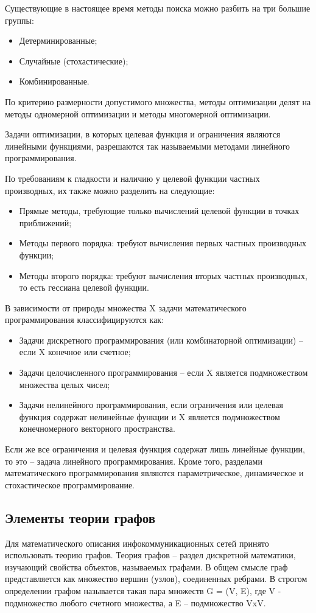 \documentclass[14pt,a4paper,titlepage]{extarticle}
\begin{document}
Существующие в настоящее время методы поиска можно разбить на три большие группы: 
\begin{itemize}
\item Детерминированные; 
\item Случайные (стохастические);
\item Комбинированные.
\end{itemize}

По критерию размерности допустимого множества, методы оптимизации делят на методы одномерной оптимизации и методы многомерной оптимизации. 

Задачи оптимизации, в которых целевая функция и ограничения являются линейными функциями, разрешаются так называемыми методами линейного программирования.

По требованиям к гладкости и наличию у целевой функции частных производных, их также можно разделить на следующие: 
\begin{itemize}
\item Прямые методы, требующие только вычислений целевой функции в точках приближений; 
\item Методы первого порядка: требуют вычисления первых частных производных функции; 
\item Методы второго порядка: требуют вычисления вторых частных производных, то есть гессиана целевой функции. 
\end{itemize}

В зависимости от природы множества X задачи математического программирования классифицируются как: 
\begin{itemize}
\item Задачи дискретного программирования (или комбинаторной оптимизации) -- если X конечное или счетное; 
\item Задачи целочисленного программирования -- если X является подмножеством множества целых чисел;
\item Задачи нелинейного программирования, если ограничения или целевая функция содержат нелинейные функции и X является подмножеством конечномерного векторного пространства. 
\end{itemize}

Если же все ограничения и целевая функция содержат лишь линейные функции, то это -- задача линейного программирования. Кроме того, разделами математического программирования являются параметрическое, динамическое и стохастическое программирование. 

\subsection{Элементы теории графов}
Для математического описания инфокоммуникационных сетей принято использовать теорию графов. Теория графов -- раздел дискретной математики, изучающий свойства объектов, называемых графами. В общем смысле граф представляется как множество вершин (узлов), соединенных ребрами. В строгом определении графом называется такая пара множеств G = (V, E), где V - подмножество любого счетного множества, а E -- подмножество VxV. 
\end{document}
